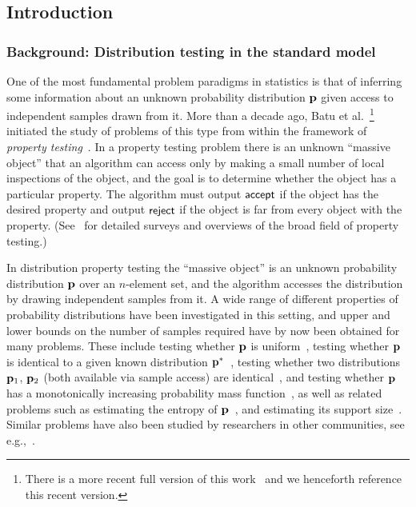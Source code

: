 \subsection{Introduction}

\subsubsection{Background: Distribution testing in the standard model}

One of the most fundamental problem paradigms in statistics is that of
inferring some information about an unknown probability distribution
$\mathbf{p}$ given access to independent samples drawn from it. More than a
decade ago,
Batu et al.~\cite{BFRSW:00}\footnote{There is a more recent full version of
 this work~\cite{BFRSW:10} and we henceforth reference this recent version.}
initiated the study of problems of this type
from within the framework of \emph{property testing}~\cite{RS:96,GGR:98}.
In a property testing problem
there is an unknown ``massive object'' that an algorithm can access
only by making a small number of local inspections of the object,
and the goal is to determine whether the object has a
particular property.  The algorithm must output $\textsf{accept}$ if the object
has the desired property and output $\textsf{reject}$ if the object is far from
every object with the property. (See~\cite{Fischer:01,Ron:08,Ron:10,Goldreich:10} for detailed surveys and overviews of the broad field of property testing.)%

In distribution property testing the ``massive object'' is an unknown
probability distribution $\mathbf{p}$ over
an $n$-element set, and the algorithm accesses the distribution by drawing
independent samples from it.
A wide range of different properties of
probability distributions have been investigated in this setting,
and upper and lower bounds on the number of samples required have by now
been obtained for many problems.  These include testing whether $\mathbf{p}$ is
uniform~\cite{GRexp:00,BFRSW:10,Paninski:08}, testing whether $\mathbf{p}$ is identical to a given known
distribution $\mathbf{p}^\ast$~\cite{BFFKRW:01}, testing whether two distributions $\mathbf{p}_1$, $\mathbf{p}_2$
(both available via sample access) are identical~\cite{BFRSW:00,Valiant:11}, and
testing whether $\mathbf{p}$ has a monotonically increasing probability mass function~\cite{BFRV:11},
       as well as related problems such as estimating the entropy of $\mathbf{p}$~\cite{BDKR:05,ValiantValiant:11},
and estimating its support size~\cite{RRSS:09,Valiant:11,ValiantValiant:11}. Similar problems have also been studied by
researchers in other communities, see e.g.,~\cite{Ma:81:Physics,Paninski:04,Paninski:08}.

